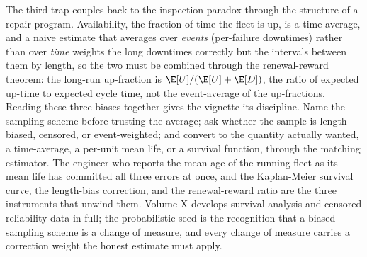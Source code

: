The third trap couples back to the inspection paradox through the
 structure of a repair program. Availability, the
fraction of time the fleet is up, is a time-average, and a naive estimate
that averages over \emph{events} (per-failure downtimes) rather than over
\emph{time} weights the long downtimes correctly but the intervals
between them by length, so the two must be combined through the
renewal-reward theorem: the long-run up-fraction is $\E[U]/(\E[U] +
\E[D])$, the ratio of expected up-time to expected cycle time, not the
event-average of the up-fractions. Reading these three biases together
gives the vignette its discipline. Name the sampling scheme before
trusting the average; ask whether the sample is length-biased, censored,
or event-weighted; and convert to the quantity actually wanted, a
time-average, a per-unit mean life, or a survival function, through the
matching estimator. The engineer who reports the mean age of the running
fleet as its mean life has committed all three errors at once, and the
Kaplan-Meier survival curve, the length-bias correction, and the
renewal-reward ratio are the three instruments that unwind them. Volume X
develops survival analysis and censored reliability data in full; the
probabilistic seed is the recognition that a biased sampling scheme is a
change of measure, and every change of measure carries a correction
weight the honest estimate must apply.

